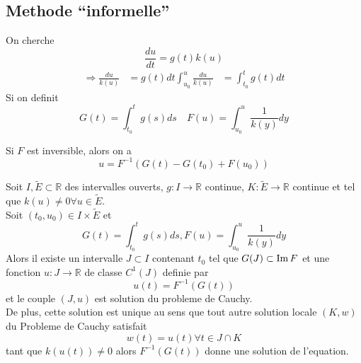 \documentclass[../main.tex]{subfiles}
\begin{document}
\subsection*{Methode ``informelle'' }
On cherche 
\[ 
	\frac{du}{dt}= g( t) k( u) 
\]
\begin{align*}
	\Rightarrow \frac{du}{k( u) } &= g( t) dt
	\int_{ u_0 }^{ u }\frac{du}{k( u) } &= \int_{ t_0 }^{ t }g( t) dt
\end{align*}
Si on definit
\[ 
	G( t) = \int_{ t_0 }^{ t }g( s) ds \quad F( u) = \int_{ u_0 }^{ u }\frac{1}{k( y) }dy
\]

Si $F$ est inversible, alors on a
\[ 
	u= F^{-1}( G( t) - G( t_0) + F( u_0) ) 
\]
\begin{thm}
	Soit $I, \tilde E \subset \mathbb{R}$ des intervalles ouverts, $g: I \to \mathbb{R}$ continue, $K: \tilde E \to \mathbb{R}$ continue et tel que $k( u) \neq 0\forall u \in \tilde E$.\\
	Soit $( t_0,u_0) \in I \times \tilde E$ et
	\[ 
		G( t) = \int_{ t_0 }^{ t }g( s) ds, F( u) = \int_{ u_0 }^{ u }\frac{1}{k( y) }dy
	\]
	Alors il existe un intervalle $J \subset I$ contenant $t_0$ tel que $G( J) \subset \operatorname*{Im} F$ et une fonction $u: J \to \mathbb{R}$ de classe $C^{1}( J) $ definie par 
	\[ 
		u( t) = F^{-1}( G( t) ) 
	\]
	et le couple $( J,u) $ est solution du probleme de Cauchy.\\
	De plus, cette solution est unique au sens que tout autre solution locale $( K,w) $ du Probleme de Cauchy satisfait
	\[ 
		w( t) = u( t) \forall t \in J\cap K
	\]
	tant que $k( u( t) ) \neq 0$ alors $F^{-1}( G( t) ) $ donne une solution de l'equation.
	
\end{thm}
\end{document}
